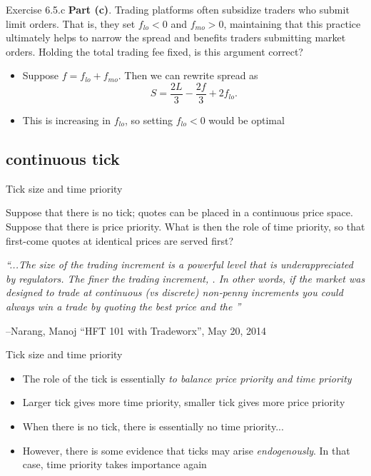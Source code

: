 \documentclass[english,10pt]{beamer}
\begin{document}
\begin{frame}{Exercise 6.5.c}
	\textbf{Part (c)}. Trading platforms often subsidize traders who submit limit orders. That is, they set $f_{lo}<0$ and $f_{mo}>0$, maintaining that this practice ultimately helps to narrow the spread and benefits traders submitting market orders. Holding the total trading fee fixed, is this argument correct?
	\smallskip
	\smallskip
	\begin{itemize}
		\item Suppose $f=f_{lo}+f_{mo}$. Then we can rewrite spread as
		\[
		S=\frac{2L}{3}-\frac{2f}{3}+2f_{lo}.
		\]
		\item This is increasing in $f_{lo}$, so setting $f_{lo}<0$ would be optimal
	\end{itemize}
\end{frame}


\subsection{continuous tick}

\begin{frame}{Tick size and time priority}
	\begin{exampleblock}{}
		Suppose that there is no tick; quotes can  be placed in a continuous price space. Suppose that there is price priority. What is then the role of time priority, so that first-come quotes at identical prices are served first?
	\end{exampleblock}
	
	\centering
	\emph{``...The size of the trading increment is a
	powerful level that is underappreciated by
	regulators. The \alert{finer the trading increment},
	. In other words, if the
	market was designed to trade at continuous
	(vs discrete) non‐penny increments you could
	always win a trade by quoting the best price
	and the ''}
	
	\begin{flushright}
		--Narang, Manoj ``HFT 101 with Tradeworx'',
		May 20, 2014
	\end{flushright}
\end{frame}


\begin{frame}{Tick size and time priority}
	\begin{itemize}
		\item The role of the tick is essentially \textit{to balance price priority and time priority}
		\item Larger tick gives more time priority, smaller tick gives more price priority
		\item When there is no tick, there is essentially no time priority...
		\item However, there is some evidence that ticks may arise \textit{endogenously}. In that case, time priority takes importance again
	\end{itemize}
\end{frame}
\end{document}

